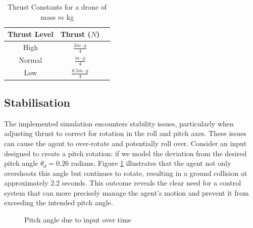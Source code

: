 \documentclass[12pt]{article}
\begin{document}
\begin{table}[ht]
    \begin{center}
    \begin{tabular}{| c | c | c |} 
    \hline
    Thrust Level & Thrust ($N$) \\ 
    \hline
    High & $\frac{2m \cdot g}{4}$\\
    \hline
    Normal & $\frac{m \cdot g}{4}$\\
    \hline
    Low & $\frac{0.5m \cdot g}{4}$\\
    \hline
    \end{tabular}
    \end{center}
    \caption{Thrust Constants for a drone of mass $m$ kg}
    \label{tab:thrust-constants}
\end{table}

\subsection{Stabilisation}
\label{sec:stabilisation}

The implemented simulation encounters stability issues, particularly when adjusting thrust to correct for rotation in the roll and pitch axes. These issues can cause the agent to over-rotate and potentially roll over. Consider an input designed to create a pitch rotation: if we model the deviation from the desired pitch angle \(\theta_{d} = 0.26\) radians, Figure \ref{fig:pitch-angle} illustrates that the agent not only overshoots this angle but continues to rotate, resulting in a ground collision at approximately 2.2 seconds. This outcome reveals the clear need for a control system that can more precisely manage the agent's motion and prevent it from exceeding the intended pitch angle.

\begin{figure}[ht]
\centering
{}
\caption{Pitch angle due to input over time}
\label{fig:pitch-angle}
\end{figure}
\end{document}
